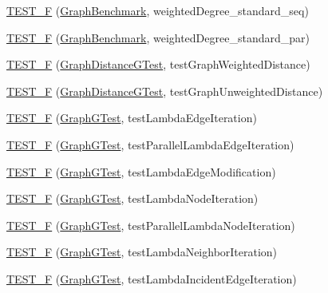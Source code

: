 \begin{DoxyCompactItemize}
\hyperlink{namespace_networ_kit_a5beab62107ae9996356af00d2733cd7f}{T\-E\-S\-T\-\_\-\-F} (\hyperlink{class_networ_kit_1_1_graph_benchmark}{Graph\-Benchmark}, weighted\-Degree\-\_\-standard\-\_\-seq)
\item 
\hyperlink{namespace_networ_kit_a162ce69cd6c125c87e50ea0369f4cec8}{T\-E\-S\-T\-\_\-\-F} (\hyperlink{class_networ_kit_1_1_graph_benchmark}{Graph\-Benchmark}, weighted\-Degree\-\_\-standard\-\_\-par)
\item 
\hyperlink{namespace_networ_kit_abc3e179075feedfb525afe8169423e5f}{T\-E\-S\-T\-\_\-\-F} (\hyperlink{class_networ_kit_1_1_graph_distance_g_test}{Graph\-Distance\-G\-Test}, test\-Graph\-Weighted\-Distance)
\item 
\hyperlink{namespace_networ_kit_af9a062b717aca314d772b7d5969c2110}{T\-E\-S\-T\-\_\-\-F} (\hyperlink{class_networ_kit_1_1_graph_distance_g_test}{Graph\-Distance\-G\-Test}, test\-Graph\-Unweighted\-Distance)
\item 
\hyperlink{namespace_networ_kit_ad40252180bd36e0238b94f5576683951}{T\-E\-S\-T\-\_\-\-F} (\hyperlink{class_networ_kit_1_1_graph_g_test}{Graph\-G\-Test}, test\-Lambda\-Edge\-Iteration)
\item 
\hyperlink{namespace_networ_kit_a2ec052386a15b77a9da5452d6866aa60}{T\-E\-S\-T\-\_\-\-F} (\hyperlink{class_networ_kit_1_1_graph_g_test}{Graph\-G\-Test}, test\-Parallel\-Lambda\-Edge\-Iteration)
\item 
\hyperlink{namespace_networ_kit_ae1c2725eb57fbfe2f0d42512d453d70a}{T\-E\-S\-T\-\_\-\-F} (\hyperlink{class_networ_kit_1_1_graph_g_test}{Graph\-G\-Test}, test\-Lambda\-Edge\-Modification)
\item 
\hyperlink{namespace_networ_kit_aa5ae2d52c221f413c51b5432eb36a88f}{T\-E\-S\-T\-\_\-\-F} (\hyperlink{class_networ_kit_1_1_graph_g_test}{Graph\-G\-Test}, test\-Lambda\-Node\-Iteration)
\item 
\hyperlink{namespace_networ_kit_a1eced118aec8d8c268f8db89355e9b41}{T\-E\-S\-T\-\_\-\-F} (\hyperlink{class_networ_kit_1_1_graph_g_test}{Graph\-G\-Test}, test\-Parallel\-Lambda\-Node\-Iteration)
\item 
\hyperlink{namespace_networ_kit_a2538cc231cd7f2daf364b5c1fb563c3f}{T\-E\-S\-T\-\_\-\-F} (\hyperlink{class_networ_kit_1_1_graph_g_test}{Graph\-G\-Test}, test\-Lambda\-Neighbor\-Iteration)
\item 
\hyperlink{namespace_networ_kit_a7226a1f21249d48c76c0e398968ac77b}{T\-E\-S\-T\-\_\-\-F} (\hyperlink{class_networ_kit_1_1_graph_g_test}{Graph\-G\-Test}, test\-Lambda\-Incident\-Edge\-Iteration)
\item 

\end{DoxyCompactItemize}
